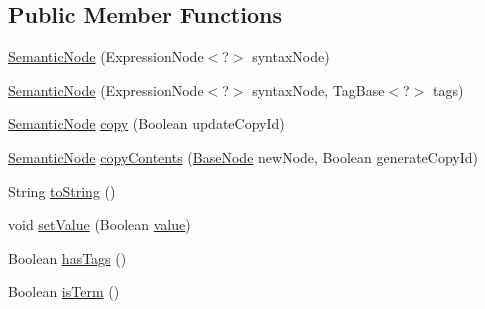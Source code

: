 \subsection*{Public Member Functions}
\begin{DoxyCompactItemize}
\item 
\hyperlink{classit_1_1emarolab_1_1cagg_1_1core_1_1evaluation_1_1semanticGrammar_1_1SemanticTree_1_1SemanticNode_a85a310707417b72426289de77e063de9}{Semantic\-Node} (Expression\-Node$<$?$>$ syntax\-Node)
\item 
\hyperlink{classit_1_1emarolab_1_1cagg_1_1core_1_1evaluation_1_1semanticGrammar_1_1SemanticTree_1_1SemanticNode_aa651f0983a2e4987123bc164c14febae}{Semantic\-Node} (Expression\-Node$<$?$>$ syntax\-Node, Tag\-Base$<$?$>$ tags)
\item 
\hyperlink{classit_1_1emarolab_1_1cagg_1_1core_1_1evaluation_1_1semanticGrammar_1_1SemanticTree_1_1SemanticNode}{Semantic\-Node} \hyperlink{classit_1_1emarolab_1_1cagg_1_1core_1_1evaluation_1_1semanticGrammar_1_1SemanticTree_1_1SemanticNode_a91b12e29e0466f3edd8b33447c474be0}{copy} (Boolean update\-Copy\-Id)
\item 
\hyperlink{classit_1_1emarolab_1_1cagg_1_1core_1_1evaluation_1_1semanticGrammar_1_1SemanticTree_1_1SemanticNode}{Semantic\-Node} \hyperlink{classit_1_1emarolab_1_1cagg_1_1core_1_1evaluation_1_1semanticGrammar_1_1SemanticTree_1_1SemanticNode_a015c469b65b2222ef702cd972aaaed64}{copy\-Contents} (\hyperlink{classit_1_1emarolab_1_1cagg_1_1core_1_1BaseNode}{Base\-Node} new\-Node, Boolean generate\-Copy\-Id)
\item 
String \hyperlink{classit_1_1emarolab_1_1cagg_1_1core_1_1evaluation_1_1semanticGrammar_1_1SemanticTree_1_1SemanticNode_a2251b3f73a4519a04981c648e3306db7}{to\-String} ()
\item 
void \hyperlink{classit_1_1emarolab_1_1cagg_1_1core_1_1evaluation_1_1semanticGrammar_1_1SemanticTree_1_1SemanticNode_a5b76008b54714c90a770e58a19dc849b}{set\-Value} (Boolean \hyperlink{classit_1_1emarolab_1_1cagg_1_1core_1_1evaluation_1_1semanticGrammar_1_1SemanticTree_1_1SemanticNode_ac0c4c50ff85ee767e4b12b97ab3ab686}{value})
\item 
Boolean \hyperlink{classit_1_1emarolab_1_1cagg_1_1core_1_1evaluation_1_1semanticGrammar_1_1SemanticTree_1_1SemanticNode_a6cf583fe8eb588177e158a52541b025b}{has\-Tags} ()
\item 
Boolean \hyperlink{classit_1_1emarolab_1_1cagg_1_1core_1_1evaluation_1_1semanticGrammar_1_1SemanticTree_1_1SemanticNode_a8cd09f0b1df4a88a8da922775918d00b}{is\-Term} ()

\end{DoxyCompactItemize}
